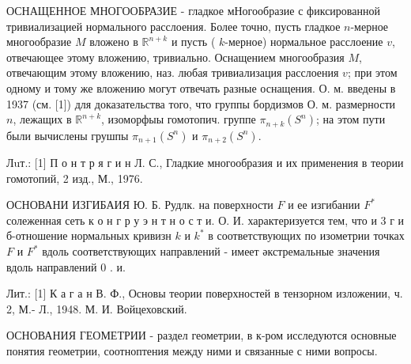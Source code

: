 \documentclass[10pt]{article}
\begin{document}
ОСНАЩЕННОЕ МНОГООБРАЗИЕ - гладкое мНогообразие с фиксированной тривиализацией нормального расслоения. Более точно, пусть гладкое $n$-мерное многообразие $M$ вложено в $\mathbb{R}^{n+k}$ и пусть ( $k$-мерное) нормальное расслоение $v$, отвечающее этому вложению, тривиально. Оснащением многообразия $M$, отвечающим этому вложению, наз. любая тривиализация расслоения $v$; при этом одному и тому же вложению могут отвечать разные оснащения. О. м. введены в 1937 (см. [1]) для доказательства того, что группы бордизмов О. м. размерности $n$, лежащих в $\mathbb{R}^{n+k}$, изоморфыы гомотопич. группе $\pi_{n+k}\left(S^{n}\right)$; на этом пути были вычислены грушпы $\pi_{n+1}\left(S^{n}\right)$ и $\pi_{n+2}\left(S^{n}\right)$.



Лuт.: [1] П о н т р я г и н Л. С., Гладкие многообразия и их применения в теории гомотопий, 2 изд., М., 1976.



ОСНОВАНИ ИЗГИБАИЯ Ю. Б. Рудлк. на поверхности $F$ и ее изгибании $F^{*}$ солеженная сеть к о н г р у э н т н о с т и. О. И. характеризуется тем, что и 3 г и б-отношение нормальных кривизн $k$ и $k^{*}$ в соответствующих по изометрии точках $F$ и $F^{*}$ вдоль соответствующих направлений - имеет әкстремальные значения вдоль направлений 0 . и.



Лит.: [1] К а г а н В. Ф., Основы теории поверхностей в тензорном изложении, ч. 2, М.- Л., 1948. М. И. Войцеховский.



ОСНОВАНИЯ ГЕОМЕТРИИ - раздел геометрии, в к-ром исследуются основные понятия геометрии, соотноптения между ними и связанные с ними вопросы.
\end{document}
